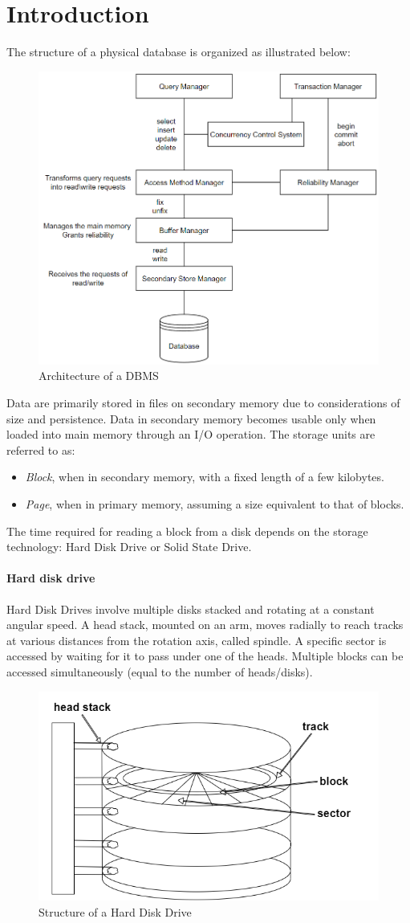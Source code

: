 \section{Introduction}

The structure of a physical database is organized as illustrated below:
\begin{figure}[H]
    \centering
    \includegraphics[width=0.5\linewidth]{images/structure.png}
    \caption{Architecture of a DBMS}
\end{figure} 

Data are primarily stored in files on secondary memory due to considerations of size and persistence.
Data in secondary memory becomes usable only when loaded into main memory through an I/O operation.
The storage units are referred to as:
\begin{itemize}
    \item \textit{Block}, when in secondary memory, with a fixed length of a few kilobytes.
    \item \textit{Page}, when in primary memory, assuming a size equivalent to that of blocks.
\end{itemize}
The time required for reading a block from a disk depends on the storage technology: Hard Disk Drive or Solid State Drive.

\paragraph*{Hard disk drive}
Hard Disk Drives involve multiple disks stacked and rotating at a constant angular speed.
A head stack, mounted on an arm, moves radially to reach tracks at various distances from the rotation axis, called spindle.
A specific sector is accessed by waiting for it to pass under one of the heads.
Multiple blocks can be accessed simultaneously (equal to the number of heads/disks).
\begin{figure}[H]
    \centering
    \includegraphics[width=0.35\linewidth]{images/hdd.png}
    \caption{Structure of a Hard Disk Drive}
\end{figure} 

